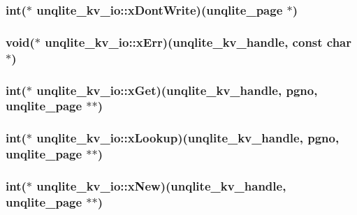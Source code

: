 \hypertarget{structunqlite__kv__io_a81996f6ecee4cfb81285f2815cf99510}{
\subsubsection[{x\-Dont\-Write}]{\setlength{\rightskip}{0pt plus 5cm}int($\ast$ unqlite\-\_\-kv\-\_\-io\-::x\-Dont\-Write)({\bf unqlite\-\_\-page} $\ast$)}}\label{dd/dc2/structunqlite__kv__io_a81996f6ecee4cfb81285f2815cf99510}
\hypertarget{structunqlite__kv__io_a4873b6f7e652e30fcd3fdce477ebd914}{
\subsubsection[{x\-Err}]{\setlength{\rightskip}{0pt plus 5cm}void($\ast$ unqlite\-\_\-kv\-\_\-io\-::x\-Err)({\bf unqlite\-\_\-kv\-\_\-handle}, const char $\ast$)}}\label{dd/dc2/structunqlite__kv__io_a4873b6f7e652e30fcd3fdce477ebd914}
\hypertarget{structunqlite__kv__io_aab20ca264415007594e1fea805db114d}{
\subsubsection[{x\-Get}]{\setlength{\rightskip}{0pt plus 5cm}int($\ast$ unqlite\-\_\-kv\-\_\-io\-::x\-Get)({\bf unqlite\-\_\-kv\-\_\-handle}, {\bf pgno}, {\bf unqlite\-\_\-page} $\ast$$\ast$)}}\label{dd/dc2/structunqlite__kv__io_aab20ca264415007594e1fea805db114d}
\hypertarget{structunqlite__kv__io_a137d8b0528c7ea4089b38513ad359858}{
\subsubsection[{x\-Lookup}]{\setlength{\rightskip}{0pt plus 5cm}int($\ast$ unqlite\-\_\-kv\-\_\-io\-::x\-Lookup)({\bf unqlite\-\_\-kv\-\_\-handle}, {\bf pgno}, {\bf unqlite\-\_\-page} $\ast$$\ast$)}}\label{dd/dc2/structunqlite__kv__io_a137d8b0528c7ea4089b38513ad359858}
\hypertarget{structunqlite__kv__io_a6ce80d5a9bc385aa3f5281c1ea98f447}{
\subsubsection[{x\-New}]{\setlength{\rightskip}{0pt plus 5cm}int($\ast$ unqlite\-\_\-kv\-\_\-io\-::x\-New)({\bf unqlite\-\_\-kv\-\_\-handle}, {\bf unqlite\-\_\-page} $\ast$$\ast$)}}\label{dd/dc2/structunqlite__kv__io_a6ce80d5a9bc385aa3f5281c1ea98f447}
